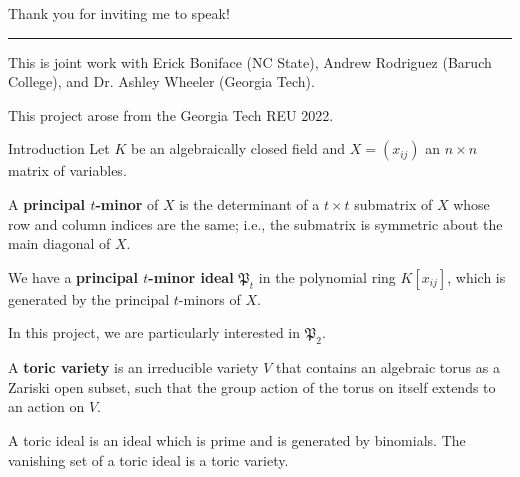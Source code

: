 \documentclass[mathserif,handout]{beamer}
\title
{\color{GTblue}{Toric varieties given by principal 2-minor ideals}}
\subtitle{Undergraduate Mathematics Research Symposium 2023}
\author[Sai Sivakumar]
{Sai Sivakumar}
\institute[Georgia Tech]{\color{GTtechgold}{University of Florida}}
\date{28 April 2023}
\newcommand{\pr}{\mathfrak P}
\theoremstyle{plain}
\theoremstyle{definition}
\theoremstyle{remark}
\begin{document}
\frame{\titlepage}

\begin{frame}{}{}
{\color{GTtechgold}Thank you for inviting me to speak!}
\vspace{0.75pc}
\hrule
\vspace{0.75pc}
This is joint work with Erick Boniface (NC State), Andrew Rodriguez (Baruch College), and Dr. Ashley Wheeler (Georgia Tech).

This project arose from the Georgia Tech REU 2022. 
\end{frame}


\begin{frame}{Introduction}
Let $K$ be an algebraically closed field and $X=(x_{ij})$ an $n\times n$ matrix of variables.

\pause
\vspace{0.75pc} 
\begin{definition}
    A \textbf{principal $t$-minor} of $X$ is the determinant of a $t\times t$ submatrix of $X$ whose row and column indices are the same; i.e., the submatrix is symmetric about the main diagonal of $X$.
\end{definition}

\pause
\vspace{0.75pc}
We have a \textbf{principal $t$-minor ideal} $\pr_t$ in the polynomial ring $K[x_{ij}]$, which is generated by the principal $t$-minors of $X$. 
\end{frame}

\begin{frame}
In this project, we are particularly interested in $\pr_2$.

\pause
\vspace{0.75pc}
\begin{definition}
    A \textbf{toric variety} is an irreducible variety $V$ that contains an algebraic torus as a Zariski open subset, such that the group action of the torus on itself extends to an action on $V$.
\end{definition}

\pause
\vspace{0.75pc}
A toric ideal is an ideal which is prime and is generated by binomials. The vanishing set of a toric ideal is a toric variety. 

\end{frame}
\end{document}
